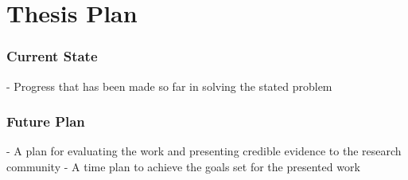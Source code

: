 \chapter{Thesis Plan}

\subsection{Current State}
- Progress that has been made so far in solving the stated problem
\subsection{Future Plan}
- A plan for evaluating the work and presenting credible evidence to the 
research community
- A time plan to achieve the goals set for the presented work